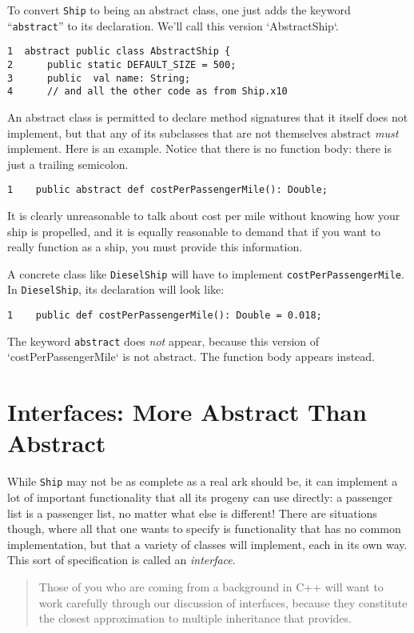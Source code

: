 To convert {\tt Ship} to being an abstract class, one just adds the keyword
``{\tt abstract}'' to its declaration.  We'll call this version
\xcd`AbstractShip`.


\begin{verbatim}
1  abstract public class AbstractShip {
2      public static DEFAULT_SIZE = 500;
3      public  val name: String;
4      // and all the other code as from Ship.x10
\end{verbatim}


An abstract class is permitted to declare method signatures that it itself
does not 
implement, but that any of its subclasses that
are not themselves abstract {\em must} implement.  Here is an example. 
Notice that there is no function body: there is just a trailing semicolon.
\begin{verbatim}
1    public abstract def costPerPassengerMile(): Double;
\end{verbatim}

It is clearly unreasonable to talk about cost per mile without knowing how
your ship is  propelled, and it is equally reasonable to demand that if you
want to really function as a ship, you must provide this information.


A concrete class like {\tt DieselShip}
will have to implement {\tt cost\-Per\-Passen\-ger\-Mile}.
In {\tt DieselShip}, its declaration will
look like:

\begin{verbatim}
1    public def costPerPassengerMile(): Double = 0.018;
\end{verbatim}
The keyword {\tt abstract} does {\em not} appear, because this version of
\xcd`costPerPassengerMile` is not abstract. 
The function body appears instead.

\section{Interfaces: More Abstract Than Abstract}\label{sec:mata}

While {\tt Ship} may not be as complete as a real ark should be, it can implement a
lot of important functionality that all its progeny can use directly: a passenger list is a 
passenger list, no matter what else is different!  There are situations though, where all
that one wants to specify is functionality that has no common implementation, but
that a variety of classes will implement, each in its own way.  This sort of specification
is called an {\em interface}.  
\begin{quote}
Those of you who are coming from a background in C++ will want to work carefully through
our discussion of interfaces, because they constitute the closest approximation
to multiple inheritance that \Xten{} provides.
\end{quote}

